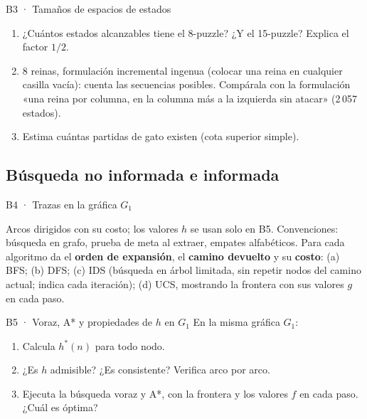 \begin{ejercicio}{B3 · Tamaños de espacios de estados }
\begin{enumerate}[label=(\alph*)]
\item ¿Cuántos estados alcanzables tiene el 8-puzzle? ¿Y el 15-puzzle? Explica el factor $1/2$.
\item 8 reinas, formulación incremental ingenua (colocar una reina en cualquier casilla vacía): cuenta
las secuencias posibles. Compárala con la formulación «una reina por columna, en la columna más
a la izquierda sin atacar» (2\,057 estados).
\item Estima cuántas partidas de gato existen (cota superior simple).
\end{enumerate}
\end{ejercicio}

\subsection{Búsqueda no informada e informada}

\begin{ejercicio}{B4 · Trazas en la gráfica $G_1$ }
\begin{center}\figGUno\end{center}
Arcos dirigidos con su costo; los valores $h$ se usan solo en B5. Convenciones: búsqueda en grafo,
prueba de meta al extraer, empates alfabéticos. Para cada algoritmo da el \textbf{orden de expansión},
el \textbf{camino devuelto} y su \textbf{costo}:
(a) BFS; (b) DFS; (c) IDS (búsqueda en árbol limitada, sin repetir nodos del camino actual;
indica cada iteración); (d) UCS, mostrando la frontera con sus valores $g$ en cada paso.
\end{ejercicio}

\begin{ejercicio}{B5 · Voraz, A* y propiedades de $h$ en $G_1$ }
En la misma gráfica $G_1$:
\begin{enumerate}[label=(\alph*)]
\item Calcula $h^*(n)$ para todo nodo.
\item ¿Es $h$ admisible? ¿Es consistente? Verifica arco por arco.
\item Ejecuta la búsqueda voraz y A*, con la frontera y los valores $f$ en cada paso. ¿Cuál es óptima?
\end{enumerate}
\end{ejercicio}

